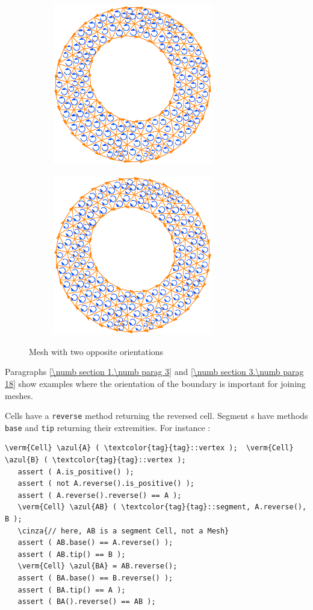 \begin{figure}[ht] \centering
\begin{subfigure}{71mm}\centering
  \includegraphics[width=70mm]{oriented-annulus-1}
\end{subfigure}  
\begin{subfigure}{71mm}\centering
  \includegraphics[width=70mm]{oriented-annulus-2}
\end{subfigure}  
  \caption{Mesh with two opposite orientations}
  \label{\numb section 1.\numb fig 4}
\end{figure}

Paragraphs \ref{\numb section 1.\numb parag 3} and \ref{\numb section 3.\numb parag 18}
show examples where the orientation of the boundary is important for joining meshes.

Cells have a {\small\tt reverse} method returning the reversed cell.
Segment {\small\tt {}}s have methods {\small\tt base} and {\small\tt tip} returning their extremities.
For instance :

\begin{Verbatim}[commandchars=\\\{\},formatcom=\small\tt,baselinestretch=0.94]
   \verm{Cell} \azul{A} ( \textcolor{tag}{tag}::vertex );  \verm{Cell} \azul{B} ( \textcolor{tag}{tag}::vertex );
   assert ( A.is_positive() );
   assert ( not A.reverse().is_positive() );
   assert ( A.reverse().reverse() == A );
   \verm{Cell} \azul{AB} ( \textcolor{tag}{tag}::segment, A.reverse(), B );
   \cinza{// here, AB is a segment Cell, not a Mesh}
   assert ( AB.base() == A.reverse() );
   assert ( AB.tip() == B );
   \verm{Cell} \azul{BA} = AB.reverse();
   assert ( BA.base() == B.reverse() );
   assert ( BA.tip() == A );
   assert ( BA().reverse() == AB );
\end{Verbatim}

